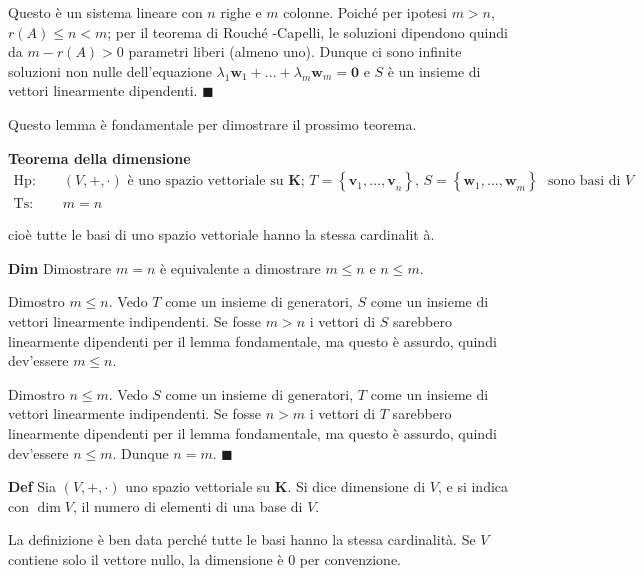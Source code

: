 \documentclass{article}
\begin{document}
Questo \`{e} un sistema lineare con $n$ righe e $m$ colonne. Poich\'{e} per
ipotesi $m>n$, $r\left( A\right) \leq n<m$; per il teorema di Rouch\'{e}%
-Capelli, le soluzioni dipendono quindi da $m-r\left( A\right) >0$ parametri
liberi (almeno uno). Dunque ci sono infinite soluzioni non nulle
dell'equazione $\lambda _{1}\mathbf{w}_{1}+\mathbf{...+}\lambda _{m}\mathbf{w%
}_{m}=\mathbf{0}$ e $S$ \`{e} un insieme di vettori linearmente dipendenti. $%
\blacksquare $

Questo lemma \`{e} fondamentale per dimostrare il prossimo teorema.

\textbf{Teorema della dimensione}%
\begin{eqnarray*}
\text{Hp}\text{: } &&\left( V,+,\cdot \right) \text{ \`{e} uno spazio
vettoriale su }\mathbf{K}\text{; }T=\left\{ \mathbf{v}_{1}\mathbf{,...,v}%
_{n}\right\} \text{, }S=\left\{ \mathbf{w}_{1}\mathbf{,...,w}_{m}\right\} 
\text{ }\text{sono basi di }V \\
\text{Ts}\text{: } &&m=n
\end{eqnarray*}

cio\`{e} tutte le basi di uno spazio vettoriale hanno la stessa cardinalit%
\`{a}.

\textbf{Dim }Dimostrare $m=n$ \`{e} equivalente a dimostrare $m\leq n$ e $%
n\leq m$.

Dimostro $m\leq n$. Vedo $T$ come un insieme di generatori, $S$ come un
insieme di vettori linearmente indipendenti. Se fosse $m>n$ i vettori di $S$
sarebbero linearmente dipendenti per il lemma fondamentale, ma questo \`{e}
assurdo, quindi dev'essere $m\leq n$.

Dimostro $n\leq m$. Vedo $S$ come un insieme di generatori, $T$ come un
insieme di vettori linearmente indipendenti. Se fosse $n>m$ i vettori di $T$
sarebbero linearmente dipendenti per il lemma fondamentale, ma questo \`{e}
assurdo, quindi dev'essere $n\leq m$. Dunque $n=m$. $\blacksquare $

\textbf{Def} Sia $\left( V,+,\cdot \right) $ uno spazio vettoriale su $%
\mathbf{K}$. Si dice dimensione di $V$, e si indica con $\dim V$, il numero
di elementi di una base di $V$.

La definizione \`{e} ben data perch\'{e} tutte le basi hanno la stessa
cardinalit\`{a}. Se $V$ contiene solo il vettore nullo, la dimensione \`{e} $%
0$ per convenzione.
\end{document}
